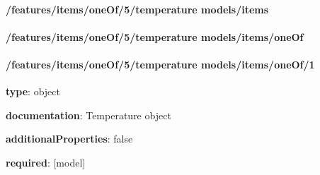 \begin{itemized}
\paragraph{/features/items/oneOf/5/temperature models/items} \begin{itemized}
\end{itemized}\end{itemized}\paragraph{/features/items/oneOf/5/temperature models/items/oneOf} \begin{itemized}
\end{itemized}\paragraph{/features/items/oneOf/5/temperature models/items/oneOf/1} \begin{itemized}
\item {\bf type}: object
\item {\bf documentation}: Temperature object
\item {\bf additionalProperties}: false
\item {\bf required}: [model]\end{itemized}
